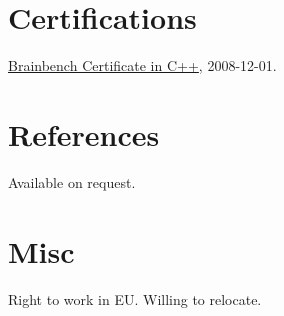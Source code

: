 \documentclass[margin,line]{res}
\begin{document}
\begin{resume}
\section{\sc Certifications}

\href{http://www.brainbench.com/transcript.jsp?pid=5078355}
{Brainbench Certificate in C++}, 2008-12-01.

\section{\sc References}

Available on request.

\section{\sc Misc}

Right to work in EU. Willing to relocate.


\end{resume}
\end{document}
